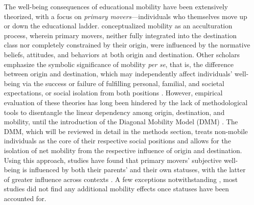 The well-being consequences of educational mobility have been extensively theorized, with a focus on \textit{primary movers}—individuals who themselves move up or down the educational ladder. \textcite{blauSocialMobilityInterpersonal1956} conceptualized mobility as an acculturation process, wherein primary movers, neither fully integrated into the destination class nor completely constrained by their origin, were influenced by the normative beliefs, attitudes, and behaviors at both origin and destination. Other scholars emphasize the symbolic significance of mobility \textit{per se}, that is, the difference between origin and destination, which may independently affect individuals' well-being via the success or failure of fulfilling personal, familial, and societal expectations, or social isolation from both positions \parencite{michalosMultipleDiscrepanciesTheory1985,sorokin1927social,sorokin1959social}. However, empirical evaluation of these theories has long been hindered by the lack of methodological tools to disentangle the linear dependency among origin, destination, and mobility, until the introduction of the Diagonal Mobility Model (DMM) \parencite{sobelDiagonalMobilityModels1981}. The DMM, which will be reviewed in detail in the methods section, treats non-mobile individuals as the core of their respective social positions and allows for the isolation of net mobility from the respective influence of origin and destination. Using this approach, studies have found that primary movers' subjective well-being is influenced by both their parents' and their own statuses, with the latter of greater influence across contexts \parencite{dhooreSocialMobilityLife2019,kwonImpactIntergenerationalMobility2022,schuckDoesIntergenerationalEducational2018,zangFrustratedAchieversSatisfied2016}. A few exceptions notwithstanding \parencite{schuckDoesIntergenerationalEducational2018}, most studies did not find any additional mobility effects once statuses have been accounted for.

